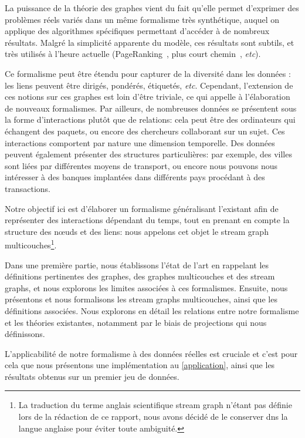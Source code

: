 \documentclass[11pt,a4paper]{article}
\theoremstyle{definition}
\theoremstyle{remark}
\theoremstyle{remark}
\def \stgm {stream graph multicouches}
\def \stgs {stream graphs}
\def \stgms {stream graphs multicouches}
\begin{document}
    La puissance de la théorie des graphes vient du fait qu'elle permet d'exprimer des problèmes réels variés dans un même formalisme très synthétique, auquel on applique des algorithmes spécifiques permettant d'accéder à de nombreux résultats. Malgré la simplicité apparente du modèle, ces résultats sont subtils, et très utilisés à l'heure actuelle (PageRanking~\cite{pr}, plus court chemin~\cite{dijkstra}, \textit{etc}).
    
    Ce formalisme peut être étendu pour capturer de la diversité dans les données : les liens peuvent être dirigés, pondérés, étiquetés, \textit{etc}. Cependant, l'extension de ces notions sur ces graphes est loin d'être triviale, ce qui appelle à l'élaboration de nouveaux formalismes. Par ailleurs, de nombreuses données se présentent sous la forme d'interactions plutôt que de relations: cela peut être des ordinateurs qui échangent des paquets, ou encore des chercheurs collaborant sur un sujet. Ces interactions comportent par nature une dimension temporelle. Des données peuvent également présenter des structures particulières: par exemple, des villes sont liées par différentes moyens de transport, ou encore nous pouvons nous intéresser à des banques implantées dans différents pays procédant à des transactions. 
    
    Notre objectif ici est d'élaborer un formalisme généralisant l'existant afin de représenter des interactions dépendant du temps, tout en prenant en compte la structure des n\oe{}uds et des liens: nous appelons cet objet le \stgm{}\footnote{La traduction du terme anglais scientifique \og stream graph \fg{} n'étant pas définie lors de la rédaction de ce rapport, nous avons décidé de le conserver dns la langue anglaise pour éviter toute ambiguité.}.
    
    
    Dans une première partie, nous établissons l'état de l'art en rappelant les définitions pertinentes des graphes, des graphes multicouches et des \stgs{}, et nous explorons les limites associées à ces formalismes. Ensuite, nous présentons et nous formalisons les \stgms{}, ainsi que les définitions associées. Nous explorons en détail les relations entre notre formalisme et les théories existantes, notamment par le biais de projections qui nous définissons.
    
    L'applicabilité de notre formalisme à des données réelles est cruciale et c'est pour cela que nous présentons une implémentation au \cref{application}, ainsi que les résultats obtenus sur un premier jeu de données.
    
\end{document}
